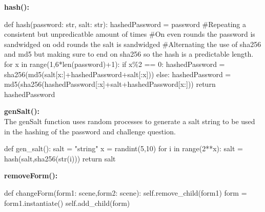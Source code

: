 \documentclass{article}
\begin{document}
        \textbf{hash():}\\
        \begin{python}
def hash(password: str, salt: str):
   hashedPassword = password
   #Repeating a consistent but unpredicatble amount of times
   #On even rounds the password is sandwidged on odd rounds the salt is sandwidged
   #Alternating the use of sha256 and md5 but making sure to end on sha256 so the hash is a predictable length.
   for x in range(1,6*len(password)+1):
      if x\%2 == 0:
         hashedPassword = sha256(md5(salt[x:]+hashedPassword+salt[:x]))
      else:
         hashedPassword = md5(sha256(hashedPassword[:x]+salt+hashedPassword[x:]))
        return hashedPassword
        \end{python}
        \textbf{genSalt():}\\
        The genSalt function uses random processes to generate a salt string to be used in the hashing of the password and challenge question.\\
        \begin{python}
def gen_salt():
   salt = "string"
   x = randint(5,10)
   for i in range(2**x):
      salt = hash(salt,sha256(str(i)))
   return salt
        \end{python}
        \textbf{removeForm():}\\
        \begin{python}
def changeForm(form1: scene,form2: scene):
   self.remove_child(form1)
   form  = form1.instantiate()
   self.add_child(form)
        \end{python}
\end{document}
